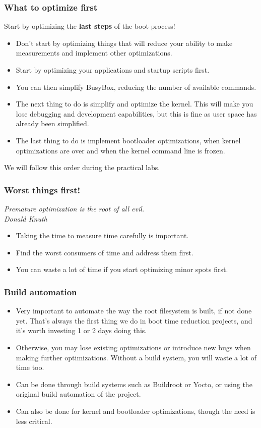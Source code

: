\begin{frame}
\frametitle{What to optimize first}
Start by optimizing the {\bf last steps} of the boot process!
\begin{itemize}
\item Don't start by optimizing things that will reduce your ability to
      make measurements and implement other optimizations.
\item Start by optimizing your applications and startup
      scripts first.
\item You can then simplify BusyBox, reducing the number of available
      commands.
\item The next thing to do is simplify and optimize the kernel. This
      will make you lose debugging and development capabilities,
      but this is fine as user space has already been simplified.
\item The last thing to do is implement bootloader optimizations,
      when kernel optimizations are over and when the kernel command
      line is frozen.
\end{itemize}
We will follow this order during the practical labs.
\end{frame}

\begin{frame}
\frametitle{Worst things first!}
{\em Premature optimization is the root of all evil.\\
Donald Knuth}
\begin{itemize}
\item Taking the time to measure time carefully is important.
\item Find the worst consumers of time and address them first.
\item You can waste a lot of time if you start optimizing
      minor spots first.
\end{itemize}
\end{frame}

\begin{frame}
\frametitle{Build automation}
\begin{itemize}
\item Very important to automate the way the root filesystem is built,
      if not done yet. That's always the first thing we do in boot time
      reduction projects, and it's worth investing 1 or 2 days doing
      this.
\item Otherwise, you may lose existing optimizations or introduce new bugs
      when making further optimizations. Without a build system,
      you will waste a lot of time too.
\item Can be done through build systems such as Buildroot or Yocto,
      or using the original build automation of the project.
\item Can also be done for kernel and bootloader optimizations, though
      the need is less critical.
\end{itemize}
\end{frame}

